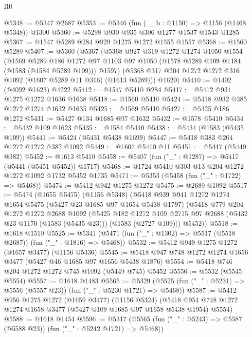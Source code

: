 \begin{lexlean}{R0}
\begin{coremodule}
@5348 := @5347 @2687
@5353 := @5346 (fun (__b : @1150) => @1156 (@1468 @5348)) @1300
@5360 := @5298 @930 @935 @306 @1277 @1537 @1543 @1285
@5367 := @1547 @5289 @284 @929 @1275 @1272 @1555 @1557
@5368 := @1560 @5289
@5407 := @5360
    (@5367
      (@5368
        @927
        @319
        @1272
        @1274
        @1050
        @1554
        (@1569
          @5289
          @186
          @1272
          @97
          @1103
          @97
          @1050
          (@1578 @5289 @109 @1184 (@1583 (@1584 @5289 @109)))
          @1597)
        (@5368 @317 @204 @1272 @1272 @316 @1092 (@1607 @5289 @11 @316) (@1613 @5289)))
      @1620)
@5410 := @1402 (@4092 @1623) @4222
@5412 := @1547 @5410 @284
@5417 := @5412 @934 @1275 @1272 @1636 @1638
@5418 := @1560 @5410
@5424 := @5418 @932 @385 @1272 @1274 @1632 @1635
@5425 := @1569 @5410
@5427 := @5425 @186 @1272
@5431 := @5427 @134 @1685 @97 @1632
@5432 := @1578 @5410
@5434 := @5432 @109 @1623
@5435 := @1584 @5410
@5438 := @5434 (@1583 (@5435 @109))
@5441 := @5424 (@5431 @5438 @1699)
@5447 := @5418 @383 @204 @1272 @1272 @382 @1092
@5449 := @1607 @5410 @11
@5451 := @5447 (@5449 @382)
@5452 := @1613 @5410
@5458 := @5407 (fun ("_" : @1287) => @5417 (@5441 (@5451 @5452)) @1717)
@5468 := @1724 @5410 @303 @13 @204 @1272 @1272 @1092 @1732 @5452 @1735
@5471 := @5353 (@5458 (fun ("_" : @1722) => @5468))
@5474 := @5412 @942 @1275 @1272
@5475 := @2689 @1092
@5517 := @5474
    (@1655 @5475)
    (@1156 @5348)
    (@5418
      @939
      @941
      @1272
      @1274
      @1654
      @5475
      (@5427 @23 @1685 @97 @1654 @5438 @1797)
      (@5418
        @779
        @204
        @1272
        @1272
        @2688
        @1092
        (@5425
          @182
          @1272
          @109
          @2715
          @97
          @2688
          (@5432 @23 @1170 (@1583 (@5435 @23)))
          (@1583 (@2727 @109)))
        @5452))
@5518 := @1618 @1510
@5525 := @5341 (@5471 (fun ("_" : @1302) => @5517 (@5518 @2687)) (fun ("_" : @1816) => @5468))
@5532 := @5412 @949 @1275 @1272 (@1657 @3477) (@1156 @5336)
@5545 := @5418 @947 @748 @1272 @1274 @1656 @3477 (@5427 @46 @1685 @97 @1656 @5438 @1876)
@5554 := @5418 @746 @204 @1272 @1272 @745 @1092 (@5449 @745) @5452
@5556 := @5532 (@5545 @5554)
@5557 := @1618 @1483
@5565 := @5329 (@5525 (fun ("_" : @5231) => @5556 (@5557 @23)) (fun ("_" : @5230 @1721) => @5468))
@5587 := @5412
    @956
    @1275
    @1272
    (@1659 @3477)
    (@1156 @5324)
    (@5418 @954 @748 @1272 @1274 @1658 @3477 (@5427 @109 @1685 @97 @1658 @5438 @1954) @5554)
@5588 := @1618 @1454
@5596 := @5317 (@5565 (fun ("_" : @5243) => @5587 (@5588 @23)) (fun ("_" : @5242 @1721) => @5468))

\end{coremodule}
\end{lexlean}
